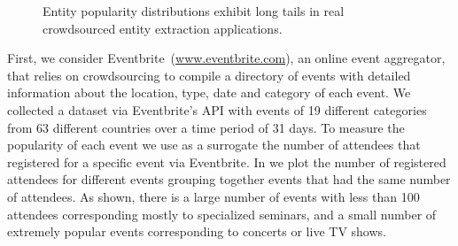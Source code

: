 \begin{figure}
	\centering
	\caption{Entity popularity distributions exhibit long tails in real crowdsourced entity extraction applications.}
\end{figure}

\begin{example}
First, we consider Eventbrite~(\url{www.eventbrite.com}), an online event aggregator, that relies on crowdsourcing to compile a directory of events with detailed information about the location, type, date and category of each event. We collected a dataset via Eventbrite's API with events of 19 different categories from 63 different countries over a time period of 31 days. To measure the popularity of each event we use as a surrogate the number of attendees that registered for a specific event via Eventbrite.  In  we plot the number of registered attendees for different events grouping together events that had the same number of attendees. As shown, there is a large number of events with less than 100 attendees corresponding mostly to specialized seminars, and a small number of extremely popular events corresponding to concerts or live TV shows. 
\end{example}

